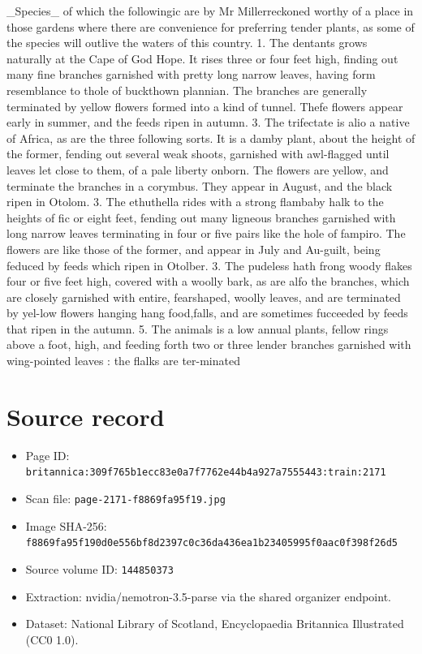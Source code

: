 \documentclass{article}
\begin{document}
\_Species\_ of which the followingic are by Mr Millerreckoned worthy of a place in those gardens where there are convenience for preferring tender plants, as some of the species will outlive the waters of this country. 1. The dentants grows naturally at the Cape of God Hope. It rises three or four feet high, finding out many fine branches garnished with pretty long narrow leaves, having form resemblance to thole of buckthown plannian. The branches are generally terminated by yellow flowers formed into a kind of tunnel. Thefe flowers appear early in summer, and the feeds ripen in autumn. 3. The trifectate is alio a native of Africa, as are the three following sorts. It is a damby plant, about the height of the former, fending out several weak shoots, garnished with awl-flagged until leaves let close to them, of a pale liberty onborn. The flowers are yellow, and terminate the branches in a corymbus. They appear in August, and the black ripen in Otolom. 3. The ethuthella rides with a strong flambaby halk to the heights of fic or eight feet, fending out many ligneous branches garnished with long narrow leaves terminating in four or five pairs like the hole of fampiro. The flowers are like those of the former, and appear in July and Au-guilt, being feduced by feeds which ripen in Otolber. 3. The pudeless hath frong woody flakes four or five feet high, covered with a woolly bark, as are alfo the branches, which are closely garnished with entire, fearshaped, woolly leaves, and are terminated by yel-low flowers hanging hang food,falls, and are sometimes fucceeded by feeds that ripen in the autumn. 5. The animals is a low annual plants, fellow rings above a foot, high, and feeding forth two or three lender branches garnished with wing-pointed leaves : the flalks are ter-minated

\section*{Source record}
\begin{itemize}
\item Page ID: \texttt{britannica:309f765b1ecc83e0a7f7762e44b4a927a7555443:train:2171}
\item Scan file: \texttt{page-2171-f8869fa95f19.jpg}
\item Image SHA-256: \texttt{f8869fa95f190d0e556bf8d2397c0c36da436ea1b23405995f0aac0f398f26d5}
\item Source volume ID: \texttt{144850373}
\item Extraction: nvidia/nemotron-3.5-parse via the shared organizer endpoint.
\item Dataset: National Library of Scotland, Encyclopaedia Britannica Illustrated (CC0 1.0).
\end{itemize}
\end{document}
